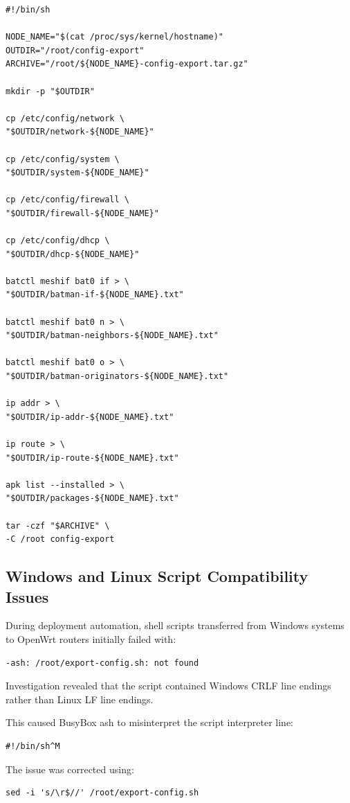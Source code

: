 \documentclass[conference]{IEEEtran}
\begin{document}
\begin{lstlisting}
#!/bin/sh

NODE_NAME="$(cat /proc/sys/kernel/hostname)"
OUTDIR="/root/config-export"
ARCHIVE="/root/${NODE_NAME}-config-export.tar.gz"

mkdir -p "$OUTDIR"

cp /etc/config/network \
"$OUTDIR/network-${NODE_NAME}"

cp /etc/config/system \
"$OUTDIR/system-${NODE_NAME}"

cp /etc/config/firewall \
"$OUTDIR/firewall-${NODE_NAME}"

cp /etc/config/dhcp \
"$OUTDIR/dhcp-${NODE_NAME}"

batctl meshif bat0 if > \
"$OUTDIR/batman-if-${NODE_NAME}.txt"

batctl meshif bat0 n > \
"$OUTDIR/batman-neighbors-${NODE_NAME}.txt"

batctl meshif bat0 o > \
"$OUTDIR/batman-originators-${NODE_NAME}.txt"

ip addr > \
"$OUTDIR/ip-addr-${NODE_NAME}.txt"

ip route > \
"$OUTDIR/ip-route-${NODE_NAME}.txt"

apk list --installed > \
"$OUTDIR/packages-${NODE_NAME}.txt"

tar -czf "$ARCHIVE" \
-C /root config-export
\end{lstlisting}

\subsection{Windows and Linux Script Compatibility Issues}

During deployment automation, shell scripts transferred from Windows systems to OpenWrt routers initially failed with:

\begin{lstlisting}
-ash: /root/export-config.sh: not found
\end{lstlisting}

Investigation revealed that the script contained Windows CRLF line endings rather than Linux LF line endings.

This caused BusyBox ash to misinterpret the script interpreter line:

\begin{lstlisting}
#!/bin/sh^M
\end{lstlisting}

The issue was corrected using:

\begin{lstlisting}
sed -i 's/\r$//' /root/export-config.sh
\end{lstlisting}
\end{document}
